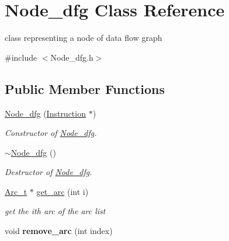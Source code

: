 \hypertarget{class_node__dfg}{\section{Node\+\_\+dfg Class Reference}
\label{class_node__dfg}
}


class representing a node of data flow graph  




{\ttfamily \#include $<$Node\+\_\+dfg.\+h$>$}

\subsection*{Public Member Functions}
\begin{DoxyCompactItemize}
\item 
\hypertarget{class_node__dfg_ac9b79961aaadf29eecd03b227b4c0875}{\hyperlink{class_node__dfg_ac9b79961aaadf29eecd03b227b4c0875}{Node\+\_\+dfg} (\hyperlink{class_instruction}{Instruction} $\ast$)}\label{class_node__dfg_ac9b79961aaadf29eecd03b227b4c0875}

\begin{DoxyCompactList}\small\item\em Constructor of \hyperlink{class_node__dfg}{Node\+\_\+dfg}. \end{DoxyCompactList}\item 
\hypertarget{class_node__dfg_a0a2a7c4634ad6802e7c69ab0d95957fa}{\hyperlink{class_node__dfg_a0a2a7c4634ad6802e7c69ab0d95957fa}{$\sim$\+Node\+\_\+dfg} ()}\label{class_node__dfg_a0a2a7c4634ad6802e7c69ab0d95957fa}

\begin{DoxyCompactList}\small\item\em Destructor of \hyperlink{class_node__dfg}{Node\+\_\+dfg}. \end{DoxyCompactList}\item 
\hypertarget{class_node__dfg_adc4a8e37604e57eec03fecaaca094fb5}{\hyperlink{struct_arc__t}{Arc\+\_\+t} $\ast$ \hyperlink{class_node__dfg_adc4a8e37604e57eec03fecaaca094fb5}{get\+\_\+arc} (int i)}\label{class_node__dfg_adc4a8e37604e57eec03fecaaca094fb5}

\begin{DoxyCompactList}\small\item\em get the ith arc of the arc list \end{DoxyCompactList}\item 
\hypertarget{class_node__dfg_a27b393ab78abb865ef7c4e494de894da}{void {\bfseries remove\+\_\+arc} (int index)}\label{class_node__dfg_a27b393ab78abb865ef7c4e494de894da}


\end{DoxyCompactItemize}
